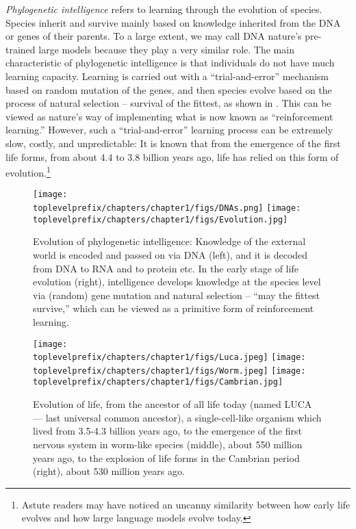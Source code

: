 \documentclass[../../book-main.tex]{subfiles}
\begin{document}
{\em Phylogenetic intelligence} refers to learning through the evolution of species. Species inherit and survive mainly based on knowledge inherited from the DNA or genes of their parents. To a large extent, we may call DNA nature's pre-trained large models because they play a very similar role. The main characteristic of phylogenetic intelligence is that individuals do not have much learning capacity. Learning is carried out with a ``trial-and-error'' mechanism based on random mutation of the genes, and then species evolve based on the process of natural selection -- survival of the fittest, as shown in .
This can be viewed as nature's way of implementing what is now known as ``reinforcement learning.'' However, such a ``trial-and-error'' learning process can be extremely slow, costly, and unpredictable: It is known that from the emergence of the first life forms, from about 4.4 to 3.8 billion years ago, life has relied on this form of evolution.\footnote{Astute readers may have noticed an uncanny similarity between how early life evolves and how large language models evolve today.} 
\begin{figure}
    \centering
\texttt{[image: \\toplevelprefix/chapters/chapter1/figs/DNAs.png]}
\texttt{[image: \\toplevelprefix/chapters/chapter1/figs/Evolution.jpg]}
    \caption{Evolution of phylogenetic intelligence: Knowledge of the external world is encoded and passed on via DNA (left), and it is decoded from DNA to RNA and to protein etc. In the early stage of life evolution (right), intelligence develops knowledge at the species level via (random) gene mutation and natural selection -- ``may the fittest survive,'' which can be viewed as a primitive form of reinforcement learning.}
    \label{fig:phylogenetic}
\end{figure}
\begin{figure}
    \centering
\texttt{[image: \\toplevelprefix/chapters/chapter1/figs/Luca.jpeg]}
\texttt{[image: \\toplevelprefix/chapters/chapter1/figs/Worm.jpeg]}
\texttt{[image: \\toplevelprefix/chapters/chapter1/figs/Cambrian.jpg]}
    \caption{Evolution of life, from the ancestor of all life today (named LUCA --- last universal common ancestor), a single-cell-like organism which lived from 3.5-4.3 billion years ago, to the emergence of the first nervous system in worm-like species (middle), about 550 million years ago, to the explosion of life forms in the Cambrian period (right), about 530 million years ago.}
    \label{fig:evolution}
\end{figure}
\end{document}
